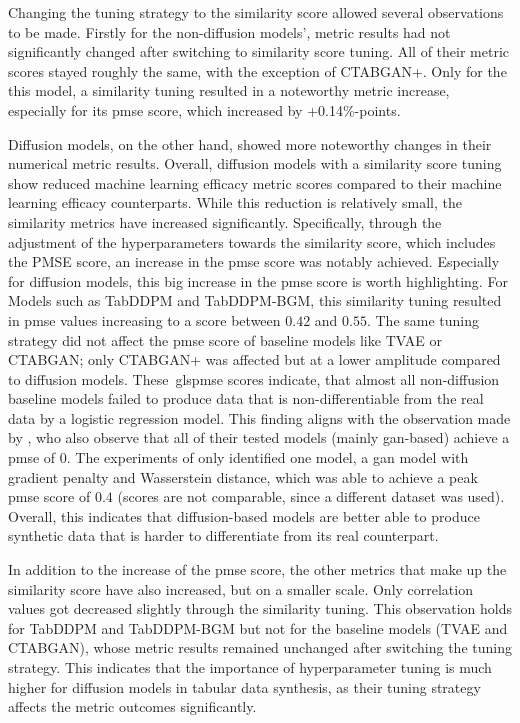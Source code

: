 Changing the tuning strategy to the similarity score allowed several observations to be made.
Firstly for the non-diffusion models', metric results had not significantly changed after switching to similarity score tuning.
All of their metric scores stayed roughly the same, with the exception of CTABGAN+.
Only for the this model, a similarity tuning resulted in a noteworthy metric increase, especially for its \gls{pmse} score, which increased by +0.14\%-points.

Diffusion models, on the other hand, showed more noteworthy changes in their numerical metric results.
Overall, diffusion models with a similarity score tuning show reduced machine learning efficacy metric scores compared to their machine learning efficacy counterparts.
While this reduction is relatively small, the similarity metrics have increased significantly.
Specifically, through the adjustment of the hyperparameters towards the similarity score, which includes the PMSE score, an increase in the \gls{pmse} score was notably achieved.
Especially for diffusion models, this big increase in the \gls{pmse} score is worth highlighting.
For Models such as TabDDPM and TabDDPM-BGM, this similarity tuning resulted in \gls{pmse} values increasing to a score between $0.42$ and $0.55$.
The same tuning strategy did not affect the \gls{pmse} score of baseline models like TVAE or CTABGAN; only CTABGAN+ was affected but at a lower amplitude compared to diffusion models.
These\ gls{pmse} scores indicate, that almost all non-diffusion baseline models failed to produce data that is non-differentiable from the real data by a logistic regression model.
This finding aligns with the observation made by \textcite{chundawat2022UniversalMetricRobust}, who also observe that all of their tested models (mainly \gls{gan}-based) achieve a \gls{pmse} of 0.
The experiments of \textcite{chundawat2022UniversalMetricRobust} only identified one model, a \gls{gan} model with gradient penalty and Wasserstein distance, which was able to achieve a peak \gls{pmse} score of $0.4$ (scores are not comparable, since a different dataset was used).
Overall, this indicates that diffusion-based models are better able to produce synthetic data that is harder to differentiate from its real counterpart.

In addition to the increase of the \gls{pmse} score, the other metrics that make up the similarity score have also increased, but on a smaller scale.
Only correlation values got decreased slightly through the similarity tuning.
This observation holds for TabDDPM and TabDDPM-BGM but not for the baseline models (TVAE and CTABGAN), whose metric results remained unchanged after switching the tuning strategy.
This indicates that the importance of hyperparameter tuning is much higher for diffusion models in tabular data synthesis, as their tuning strategy affects the metric outcomes significantly.

